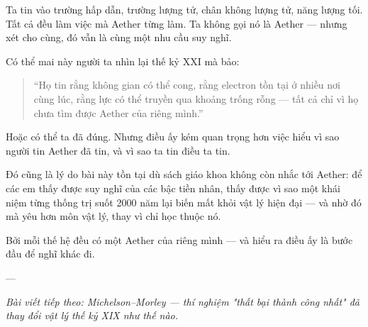 Ta tin vào trường hấp dẫn, trường lượng tử, chân không lượng tử, năng lượng tối. Tất cả đều làm việc mà Aether từng làm. Ta không gọi nó là Aether — nhưng xét cho cùng, đó vẫn là cùng một nhu cầu suy nghĩ.

Có thể mai này người ta nhìn lại thế kỷ XXI mà bảo:
\begin{quote}
“Họ tin rằng không gian có thể cong, rằng electron tồn tại ở nhiều nơi cùng lúc, rằng lực có thể truyền qua khoảng trống rỗng — tất cả chỉ vì họ chưa tìm được Aether của riêng mình.”
\end{quote}

Hoặc có thể ta đã đúng. Nhưng điều ấy kém quan trọng hơn việc hiểu vì sao người tin Aether đã tin, và vì sao ta tin điều ta tin.

Đó cũng là lý do bài này tồn tại dù sách giáo khoa không còn nhắc tới Aether: để các em thấy được suy nghĩ của các bậc tiền nhân, thấy được vì sao một khái niệm từng thống trị suốt 2000 năm lại biến mất khỏi vật lý hiện đại — và nhờ đó mà yêu hơn môn vật lý, thay vì chỉ học thuộc nó.

Bởi mỗi thế hệ đều có một Aether của riêng mình — và hiểu ra điều ấy là bước đầu để nghĩ khác đi.

---

\textit{Bài viết tiếp theo: Michelson–Morley — thí nghiệm "thất bại thành công nhất" đã thay đổi vật lý thế kỷ XIX như thế nào.}
